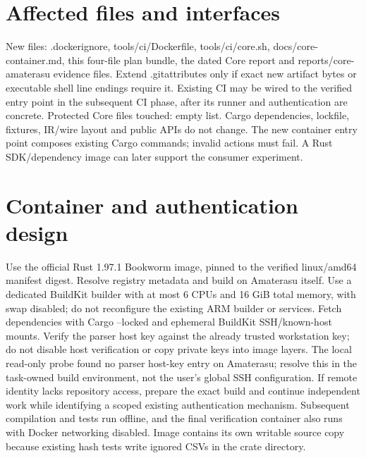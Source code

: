 \documentclass[11pt,a4paper]{article}
\begin{document}
\section{Affected files and interfaces}
New files: .dockerignore, tools/ci/Dockerfile, tools/ci/core.sh,
docs/core-container.md, this four-file plan bundle, the dated Core report and
reports/core-amaterasu evidence files. Extend .gitattributes only if exact new
artifact bytes or executable shell line endings require it. Existing CI may be
wired to the verified entry point in the subsequent CI phase, after its runner
and authentication are concrete. Protected Core files touched: empty list.
Cargo dependencies, lockfile, fixtures, IR/wire layout and public APIs do not change.
The new container entry point composes existing Cargo commands; invalid actions
must fail. A Rust SDK/dependency image can later support the consumer experiment.
\section{Container and authentication design}
Use the official Rust 1.97.1 Bookworm image, pinned to the verified linux/amd64
manifest digest. Resolve registry metadata and build on Amaterasu itself.
Use a dedicated BuildKit builder with at most 6 CPUs and 16 GiB total memory,
with swap disabled; do not reconfigure the existing ARM builder or services.
Fetch dependencies with Cargo --locked and ephemeral BuildKit SSH/known-host
mounts. Verify the parser host key against the already trusted workstation key;
do not disable host verification or copy private keys into image layers.
The local read-only probe found no parser host-key entry on Amaterasu; resolve
this in the task-owned build environment, not the user's global SSH configuration.
If remote identity lacks repository access, prepare the exact build and continue
independent work while identifying a scoped existing authentication mechanism.
Subsequent compilation and tests run offline, and the final verification container
also runs with Docker networking disabled. Image contains its own writable
source copy because existing hash tests write ignored CSVs in the crate directory.
\end{document}
